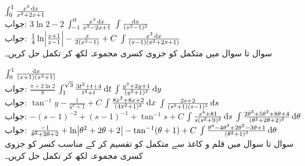 $\int_0^1\frac{x^3\dif x}{x^2+2x+1}$\\
جواب:\quad
$3\ln 2-2$
$\int_{-1}^0\frac{x^3\dif x}{x^2-2x+1}$
$\int\frac{\dif x}{(x^2-1)^2}$\\
جواب:\quad
$\tfrac{1}{4}\ln\abs{\tfrac{x+1}{x-1}}-\tfrac{x}{2(x^2-1)}+C$
$\int\frac{x^2\dif x}{(x-1)(x^2+2x+1)}$
\\
سوال  تا سوال  میں متکمل کو جزوی کسری مجموعہ لکھ کر تکمل حل کریں۔

$\int_0^1\frac{\dif x}{(x+1)(x^2+1)}$\\
جواب:\quad
$\tfrac{\pi+2\ln 2}{8}$
$\int_1^{\sqrt{3}}\frac{3t^2+t+4}{t^3+t}\dif t$
$\int\frac{y^2+2y+1}{(y^2+1)^2}\dif y$\\
جواب:\quad
$\tan^{-1}y-\tfrac{1}{y^2+1}+C$
$\int\frac{8x^2+8x+2}{(4x^2+1)^2}\dif x$
$\int\frac{2s+2}{(s^2+1)(s-1)^3}\dif s$\\
جواب:\quad
$-(s-1)^{-2}+(s-1)^{-1}+\tan^{-1} s+C$
$\int\frac{s^4+81}{s(s^2+9)^2}\dif s$
$\int\frac{2\theta^3+5\theta^2+8\theta+4}{(\theta^2+2\theta+2)^2}\dif\theta$\\
جواب:\quad
$\tfrac{-1}{\theta^2+2\theta+2}+\ln\abs{\theta^2+2\theta+2}-\tan^{-1}(\theta+1)+C$
$\int\frac{\theta^4-4\theta^3+2\theta^2-3\theta+1}{(\theta^2+1)^3}\dif\theta$
\\
سوال  تا سوال  میں قلم و کاغذ سے متکمل کو تقسیم کر کے مناسب کسر کو جزوی کسری مجموعہ لکھ کر تکمل حل کریں۔ 

